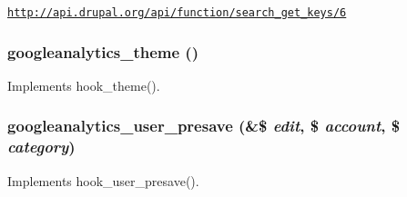 \href{http://api.drupal.org/api/function/search_get_keys/6}{\tt http://api.drupal.org/api/function/search\_\-get\_\-keys/6} \hypertarget{googleanalytics_8module_a663727599ce5534bc4c145ff1b600b8d}{
\subsubsection[{googleanalytics\_\-theme}]{\setlength{\rightskip}{0pt plus 5cm}googleanalytics\_\-theme ()}}
\label{googleanalytics_8module_a663727599ce5534bc4c145ff1b600b8d}
Implements hook\_\-theme(). \hypertarget{googleanalytics_8module_ac4b9f0ae49deb0cc6be3e2bc164d8412}{
\subsubsection[{googleanalytics\_\-user\_\-presave}]{\setlength{\rightskip}{0pt plus 5cm}googleanalytics\_\-user\_\-presave (\&\$ {\em edit}, \/  \$ {\em account}, \/  \$ {\em category})}}
\label{googleanalytics_8module_ac4b9f0ae49deb0cc6be3e2bc164d8412}
Implements hook\_\-user\_\-presave(). 